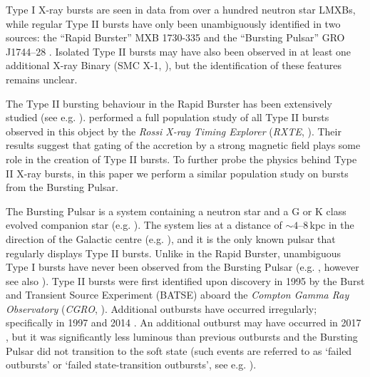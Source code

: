 \par Type I X-ray bursts are seen in data from over a hundred neutron star LMXBs, while regular Type II bursts have only been unambiguously identified in two sources: the ``Rapid Burster'' MXB 1730-335 \citep{Lewin_TypeII} and the ``Bursting Pulsar'' GRO J1744--28 \citep{Kouveliotou_BP}.   Isolated Type II bursts may have also been observed in at least one additional X-ray Binary (SMC X-1, \citealp{Angelini_SMC}), but the identification of these features remains unclear.
\par The Type II bursting behaviour in the Rapid Burster has been extensively studied (see e.g. \citealp{Lewin_TypeII,Hoffman_RB}).  \citet{Bagnoli_PopStudy} performed a full population study of all Type II bursts observed in this object by the \textit{Rossi X-ray Timing Explorer} (\textit{RXTE}, \citealp{Bradt_RXTE}).  Their results suggest that gating of the accretion by a strong magnetic field plays some role in the creation of Type II bursts.  To further probe the physics behind Type II X-ray bursts, in this paper we perform a similar population study on bursts from the Bursting Pulsar.
\par The Bursting Pulsar \citep{Paciesas_BPDiscovery} is a system containing a neutron star and a G or K class evolved companion star (e.g. \citealp{Sturner_BPNature,Gosling_BPCompanion,Masetti_BPCompanion}).  The system lies at a distance of $\sim4$--$8$\,kpc in the direction of the Galactic centre (e.g. \citealp{Kouveliotou_BP,Gosling_BPCompanion,Sanna_BP}), and it is the only known pulsar that regularly displays Type II bursts.  Unlike in the Rapid Burster, unambiguous Type I bursts have never been observed from the Bursting Pulsar (e.g. \citealp{Giles_BP}, however see also \citealp{Lamb_TypeIBP,Doroshenko_NBFlash}).  Type II bursts were first identified upon discovery in 1995 by the Burst and Transient Source Experiment (BATSE) aboard the \textit{Compton Gamma Ray Observatory} (\textit{CGRO}, \citealp{Gehrels_CGRO}).  Additional outbursts have occurred irregularly; specifically in 1997 and 2014 \citep{Woods_OB2,Kennea_BPOutburst}.  An additional outburst may have occurred in 2017 \citep{Sanna_BPOutburst}, but it was significantly less luminous than previous outbursts and the Bursting Pulsar did not transition to the soft state (such events are referred to as `failed outbursts' or `failed state-transition outbursts', see e.g. \citealp{Sturner_Failed}).
